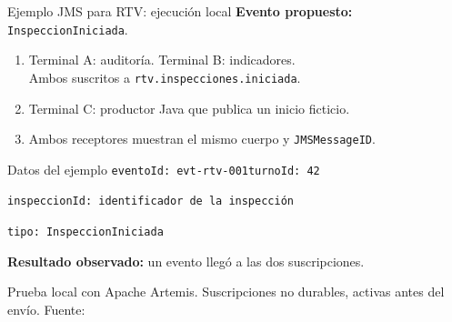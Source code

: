 \begin{frame}{Ejemplo JMS para RTV: ejecución local}
\small
{\small\textbf{Evento propuesto:} \texttt{InspeccionIniciada}.}
\vspace{2mm}
\begin{enumerate}
  \item Terminal A: auditoría. Terminal B: indicadores.\\Ambos suscritos a \texttt{rtv.inspecciones.iniciada}.
  \item Terminal C: productor Java que publica un inicio ficticio.
  \item Ambos receptores muestran el mismo cuerpo y \texttt{JMSMessageID}.
\end{enumerate}
\begin{block}{Datos del ejemplo}
\small
\texttt{eventoId: evt-rtv-001}\quad\texttt{turnoId: 42}\par
\texttt{inspeccionId: identificador de la inspección}\par
\texttt{tipo: InspeccionIniciada}
\end{block}
{\small\textbf{Resultado observado:} un evento llegó a las dos suscripciones.}\par\vspace{2mm}
{\scriptsize\color{gris}Prueba local con Apache Artemis. Suscripciones no durables, activas antes del envío.}
\vfill\hfill{\tiny\color{gris}Fuente: \cite{jakarta2022}}\vspace{-0.11cm}
\end{frame}

